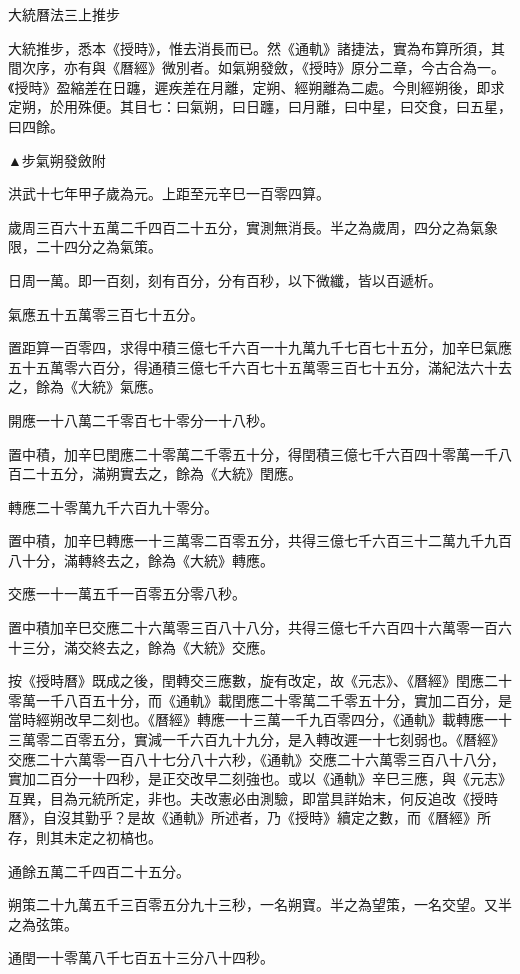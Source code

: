 大統曆法三上推步

大統推步，悉本《授時》，惟去消長而已。然《通軌》諸捷法，實為布算所須，其間次序，亦有與《曆經》微別者。如氣朔發斂，《授時》原分二章，今古合為一。《授時》盈縮差在日躔，遲疾差在月離，定朔、經朔離為二處。今則經朔後，即求定朔，於用殊便。其目七：曰氣朔，曰日躔，曰月離，曰中星，曰交食，曰五星，曰四餘。

▲步氣朔發斂附

洪武十七年甲子歲為元。上距至元辛巳一百零四算。

歲周三百六十五萬二千四百二十五分，實測無消長。半之為歲周，四分之為氣象限，二十四分之為氣策。

日周一萬。即一百刻，刻有百分，分有百秒，以下微纖，皆以百遞析。

氣應五十五萬零三百七十五分。

置距算一百零四，求得中積三億七千六百一十九萬九千七百七十五分，加辛巳氣應五十五萬零六百分，得通積三億七千六百七十五萬零三百七十五分，滿紀法六十去之，餘為《大統》氣應。

開應一十八萬二千零百七十零分一十八秒。

置中積，加辛巳閏應二十零萬二千零五十分，得閏積三億七千六百四十零萬一千八百二十五分，滿朔實去之，餘為《大統》閏應。

轉應二十零萬九千六百九十零分。

置中積，加辛巳轉應一十三萬零二百零五分，共得三億七千六百三十二萬九千九百八十分，滿轉終去之，餘為《大統》轉應。

交應一十一萬五千一百零五分零八秒。

置中積加辛巳交應二十六萬零三百八十八分，共得三億七千六百四十六萬零一百六十三分，滿交終去之，餘為《大統》交應。

按《授時曆》既成之後，閏轉交三應數，旋有改定，故《元志》、《曆經》閏應二十零萬一千八百五十分，而《通軌》載閏應二十零萬二千零五十分，實加二百分，是當時經朔改早二刻也。《曆經》轉應一十三萬一千九百零四分，《通軌》載轉應一十三萬零二百零五分，實減一千六百九十九分，是入轉改遲一十七刻弱也。《曆經》交應二十六萬零一百八十七分八十六秒，《通軌》交應二十六萬零三百八十八分，實加二百分一十四秒，是正交改早二刻強也。或以《通軌》辛巳三應，與《元志》互異，目為元統所定，非也。夫改憲必由測驗，即當具詳始末，何反追改《授時曆》，自沒其勤乎？是故《通軌》所述者，乃《授時》續定之數，而《曆經》所存，則其未定之初槁也。

通餘五萬二千四百二十五分。

朔策二十九萬五千三百零五分九十三秒，一名朔寶。半之為望策，一名交望。又半之為弦策。

通閏一十零萬八千七百五十三分八十四秒。

